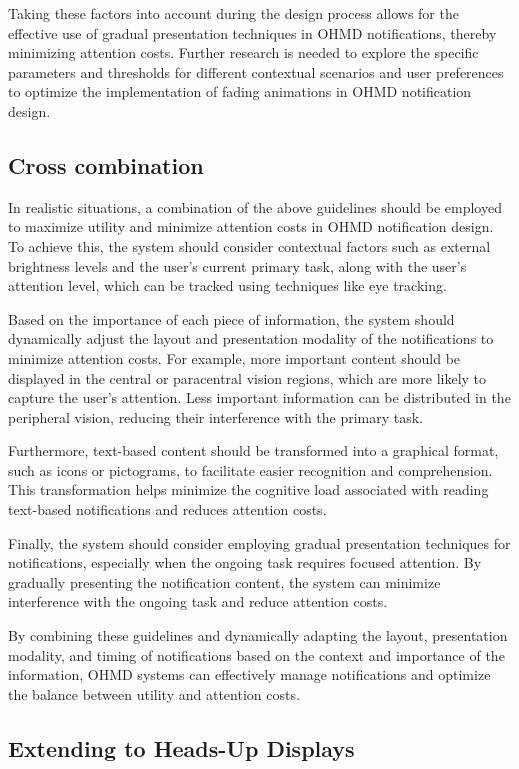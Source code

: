 Taking these factors into account during the design process allows for the effective use of gradual presentation techniques in OHMD notifications, thereby minimizing attention costs. Further research is needed to explore the specific parameters and thresholds for different contextual scenarios and user preferences to optimize the implementation of fading animations in OHMD notification design.

\subsection{Cross combination}

In realistic situations, a combination of the above guidelines should be employed to maximize utility and minimize attention costs in OHMD notification design. To achieve this, the system should consider contextual factors such as external brightness levels and the user's current primary task, along with the user's attention level, which can be tracked using techniques like eye tracking.

Based on the importance of each piece of information, the system should dynamically adjust the layout and presentation modality of the notifications to minimize attention costs. For example, more important content should be displayed in the central or paracentral vision regions, which are more likely to capture the user's attention. Less important information can be distributed in the peripheral vision, reducing their interference with the primary task.

Furthermore, text-based content should be transformed into a graphical format, such as icons or pictograms, to facilitate easier recognition and comprehension. This transformation helps minimize the cognitive load associated with reading text-based notifications and reduces attention costs.

Finally, the system should consider employing gradual presentation techniques for notifications, especially when the ongoing task requires focused attention. By gradually presenting the notification content, the system can minimize interference with the ongoing task and reduce attention costs.

By combining these guidelines and dynamically adapting the layout, presentation modality, and timing of notifications based on the context and importance of the information, OHMD systems can effectively manage notifications and optimize the balance between utility and attention costs.

\subsection{Extending to Heads-Up Displays}

